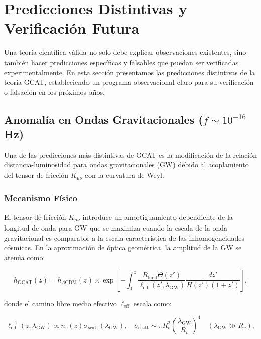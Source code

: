 \documentclass[12pt, a4paper]{article}
\theoremstyle{plain}
\theoremstyle{definition}
\begin{document}
\section{Predicciones Distintivas y Verificación Futura}
\label{sec:predicciones}

Una teoría científica válida no solo debe explicar observaciones existentes, sino también hacer predicciones específicas y falsables que puedan ser verificadas experimentalmente. En esta sección presentamos las predicciones distintivas de la teoría GCAT, estableciendo un programa observacional claro para su verificación o falsación en los próximos años.

\subsection{Anomalía en Ondas Gravitacionales ($f \sim 10^{-16}$ Hz)}

Una de las predicciones más distintivas de GCAT es la modificación de la relación distancia-luminosidad para ondas gravitacionales (GW) debido al acoplamiento del tensor de fricción $K_{\mu\nu}$ con la curvatura de Weyl.

\subsubsection{Mecanismo Físico}

El tensor de fricción $K_{\mu\nu}$ introduce un amortiguamiento dependiente de la longitud de onda para GW que se maximiza cuando la escala de la onda gravitacional es comparable a la escala característica de las inhomogeneidades cósmicas. En la aproximación de óptica geométrica, la amplitud de la GW se atenúa como:

\begin{equation}
h_{\mathrm{GCAT}}(z) = h_{\Lambda\mathrm{CDM}}(z) \times 
\exp\left[-\int_0^z \frac{R_{\mathrm{fund}} \Theta(z')}{\ell_{\mathrm{eff}}(z', \lambda_{\mathrm{GW}})} 
\frac{dz'}{H(z')(1+z')}\right],
\label{eq:gw_damping_full}
\end{equation}

donde el camino libre medio efectivo $\ell_{\mathrm{eff}}$ escala como:

\begin{equation}
\ell_{\mathrm{eff}}^{-1}(z, \lambda_{\mathrm{GW}}) \propto n_v(z) \sigma_{\mathrm{scatt}}(\lambda_{\mathrm{GW}}), 
\quad \sigma_{\mathrm{scatt}} \sim \pi R_v^2 \left(\frac{\lambda_{\mathrm{GW}}}{R_v}\right)^4 \quad (\lambda_{\mathrm{GW}} \gg R_v),
\end{equation}
\end{document}

